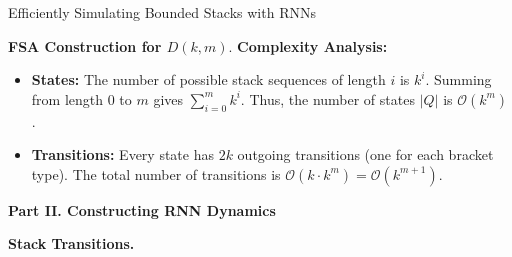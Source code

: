 \begin{question}{Efficiently Simulating Bounded Stacks with RNNs}
\begin{subquestion}{\textbf{FSA Construction for $D(k,m)$}.}
\textbf{Complexity Analysis:}
\begin{itemize}
    \item \textbf{States:} The number of possible stack sequences of length $i$ is $k^i$. Summing from length 0 to $m$ gives $\sum_{i=0}^m k^i$. Thus, the number of states $|Q|$ is $\mathcal{O}(k^m)$.
    \item \textbf{Transitions:} Every state has $2k$ outgoing transitions (one for each bracket type). The total number of transitions is $\mathcal{O}(k \cdot k^m) = \mathcal{O}(k^{m+1})$.
\end{itemize}

\end{subquestion}

\textbf{Part II. Constructing RNN Dynamics}

\begin{subquestion}{\textbf{Stack Transitions.}}


\end{subquestion}
\end{question}
